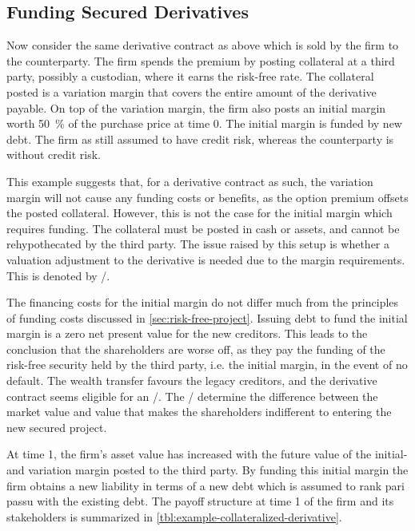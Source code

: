 \documentclass[../main.tex]{subfiles}
\begin{document}
    \subsection{Funding Secured Derivatives}
    \label{sec:example-secured-derivative}
        Now consider the same derivative contract as above which is sold by the firm to the counterparty.
        The firm spends the premium by posting collateral at a third party, possibly a custodian, where it earns the risk-free rate.
        The collateral posted is a variation margin that covers the entire amount of the derivative payable.
        On top of the variation margin, the firm also posts an initial margin worth 
        \qty[round-precision=0]{50}{\percent} of the purchase price at time 0.
        The initial margin is funded by new debt.
        The firm as still assumed to have credit risk, whereas the counterparty is without credit risk.


        This example suggests that, for a derivative contract as such,
        the variation margin will not cause any funding costs or benefits,
        as the option premium offsets the posted collateral.
        However, this is not the case for the initial margin which requires funding.
        The collateral must be posted in cash or assets, and cannot be rehypothecated by the third party.
        The issue raised by this setup is whether a valuation adjustment to the derivative is needed due to the margin requirements.
        This is denoted by \MVA/.

        The financing costs for the initial margin do not differ much from the principles of funding costs discussed in \cref{sec:risk-free-project}.
        Issuing debt to fund the initial margin is a zero net present value for the new creditors.
        This leads to the conclusion that the shareholders are worse off, as they pay the funding of the risk-free security held by the third party, i.e. the initial margin, in the event of no default.
        The wealth transfer favours the legacy creditors,
        and the derivative contract seems eligible for an \MVA/.
        The \MVA/ determine the difference between the market value and value that makes the shareholders indifferent to entering the new secured project.

        At time 1, the firm's asset value has increased with the future value of the initial- and variation margin posted to the third party.
        By funding this initial margin the firm obtains a new liability in terms of a new debt which is assumed to rank pari passu with the existing debt.
        The payoff structure at time 1 of the firm and its stakeholders
        is summarized in \cref{tbl:example-collateralized-derivative}.
\end{document}
